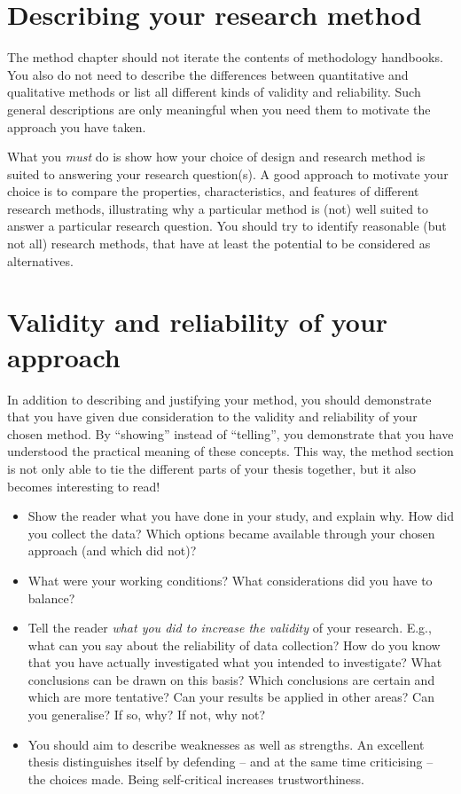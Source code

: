 \documentclass[a4paper,twoside]{bth}
\begin{document}
\section{Describing your research method}
The method chapter should not iterate the contents of methodology handbooks. You also do not need to describe the differences between quantitative and qualitative methods or list all different kinds of validity and reliability. Such general descriptions are only meaningful when you need them to motivate the approach you have taken.

What you \emph{must} do is show how your choice of design and research method is suited to answering your research question(s). A good approach to motivate your choice is to compare the properties, characteristics, and features of different research methods, illustrating why a particular method is (not) well suited to answer a particular research question. You should try to identify reasonable (but not all) research methods, that have at least the potential to be considered as alternatives.


\section{Validity and reliability of your approach}
In addition to describing and justifying your method, you should demonstrate that you have given due consideration to the validity and reliability of your chosen method. By ``showing'' instead of ``telling'', you demonstrate that you have understood the practical meaning of these concepts. This way, the method section is not only able to tie the different parts of your thesis together, but it also becomes interesting to read!

\begin{itemize}
    \item Show the reader what you have done in your study, and explain why. How did you collect the data? Which options became available through your chosen approach (and which did not)?
    \item What were your working conditions? What considerations did you have to balance?
    \item Tell the reader \emph{what you did to increase the validity} of
    your research. E.g., what can you say about the reliability of data
    collection? How do you know that you have actually investigated what you 
    intended to investigate? What conclusions can be drawn on this basis? 
    Which conclusions are certain and which are more tentative? Can your 
    results be applied in other areas? Can you generalise? If so, why? If 
    not, why not?
    \item You should aim to describe weaknesses as well as strengths. An excellent thesis distinguishes itself by defending -- and at the same time criticising -- the choices made. Being self-critical increases trustworthiness.
\end{itemize}
\end{document}
